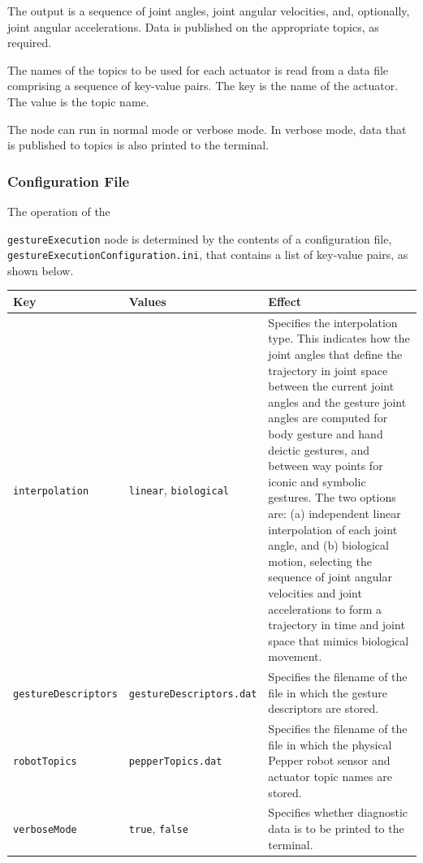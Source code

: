 \documentclass{CSSRforAfrica}
\begin{document}
{The output is a sequence of joint angles, joint angular velocities, and, optionally, joint angular accelerations. Data is published on the appropriate topics, as required.
 
The names of the topics to be used for each actuator is read from a data file comprising a sequence of key-value pairs. The key is the name of the actuator. The value is the topic name.    

The node can run in normal mode or verbose mode. In verbose mode, data that is published to topics is also printed to the terminal.


\subsubsection*{Configuration File}

The operation of the {{\small \verb+gestureExecution+} node is determined by the contents of a configuration file,\\ {\small \verb+gestureExecutionConfiguration.ini+}, that contains a list of key-value pairs, as shown below.

\begin{center}
\begin{tabularx}{\linewidth}{| l | l | X|}
\hline 
{\small Key }                               & {\small Values }                                                 &  {\small Effect}       \\
\hline
{\footnotesize \verb+interpolation+ }  & {\footnotesize \verb+linear+, \verb+biological+}     & {\small Specifies the interpolation type. This indicates how the joint angles that define the trajectory in joint space between the current joint angles and the gesture joint angles are computed for body gesture and hand deictic gestures, and between way points for iconic and symbolic gestures. The two options are: (a) independent linear  interpolation of each joint angle, and (b)  biological motion, selecting  the sequence of  joint angular velocities and joint accelerations  to form a trajectory in time and joint space that mimics biological movement.}\\ 
\hline
{\footnotesize \verb+gestureDescriptors+ }  & {\footnotesize \verb+gestureDescriptors.dat+}     & {\small Specifies the  filename of the file in which the gesture descriptors are stored.} \\ 
\hline
{\footnotesize \verb+robotTopics+ }  & {\footnotesize \verb+pepperTopics.dat+}     & {\small Specifies the filename of the file in which the physical Pepper robot sensor and actuator topic names are stored.} \\
\hline
{\footnotesize \verb+verboseMode+}  & {\footnotesize \verb+true+, \verb+false+}     & {\small Specifies whether diagnostic data is to be printed to the terminal.} \\
\hline
\end{tabularx}
\end{center}


}}
\end{document}
